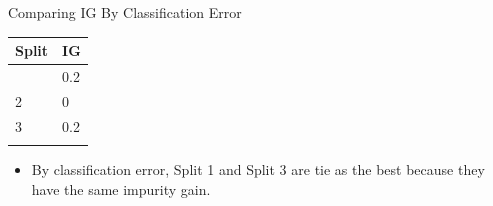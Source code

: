 \documentclass[
  ignorenonframetext,
]{beamer}
\providecommand{\tightlist}{%
  \setlength{\itemsep}{0pt}\setlength{\parskip}{0pt}}\usepackage{longtable,booktabs,array}
\begin{document}
\begin{frame}{Comparing IG By Classification Error}
\label{comparing-ig-by-classification-error}
\begin{longtable}[]{@{}ll@{}}
\toprule\noalign{}
Split & IG \\
\midrule\noalign{}
\endhead
1 & 0.2 \\
2 & 0 \\
3 & 0.2 \\
\bottomrule\noalign{}
\end{longtable}

\begin{itemize}
\tightlist
\item
  By classification error, Split 1 and Split 3 are tie as the best
  because they have the same impurity gain.
\end{itemize}
\end{frame}
\end{document}
